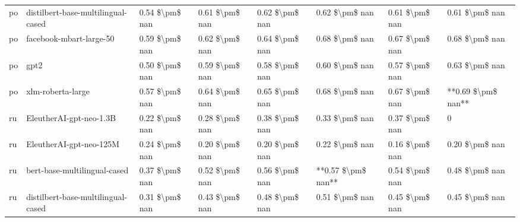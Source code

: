 \begin{tabular}{llllllll}
      po & distilbert-base-multilingual-cased & 0.54 \$\textbackslash pm\$ nan &            0.61 \$\textbackslash pm\$ nan &        0.62 \$\textbackslash pm\$ nan &         0.62 \$\textbackslash pm\$ nan &                          0.61 \$\textbackslash pm\$ nan &     0.61 \$\textbackslash pm\$ nan \\
      po &            facebook-mbart-large-50 & 0.59 \$\textbackslash pm\$ nan &            0.62 \$\textbackslash pm\$ nan &        0.64 \$\textbackslash pm\$ nan &         0.68 \$\textbackslash pm\$ nan &                          0.67 \$\textbackslash pm\$ nan &     0.68 \$\textbackslash pm\$ nan \\
      po &                               gpt2 & 0.50 \$\textbackslash pm\$ nan &            0.59 \$\textbackslash pm\$ nan &        0.58 \$\textbackslash pm\$ nan &         0.60 \$\textbackslash pm\$ nan &                          0.57 \$\textbackslash pm\$ nan &     0.63 \$\textbackslash pm\$ nan \\
      po &                  xlm-roberta-large & 0.57 \$\textbackslash pm\$ nan &            0.64 \$\textbackslash pm\$ nan &        0.65 \$\textbackslash pm\$ nan &         0.68 \$\textbackslash pm\$ nan &                          0.67 \$\textbackslash pm\$ nan & **0.69 \$\textbackslash pm\$ nan** \\
      ru &            EleutherAI-gpt-neo-1.3B & 0.22 \$\textbackslash pm\$ nan &            0.28 \$\textbackslash pm\$ nan &        0.38 \$\textbackslash pm\$ nan &         0.33 \$\textbackslash pm\$ nan &                          0.37 \$\textbackslash pm\$ nan &                  0 \\
      ru &            EleutherAI-gpt-neo-125M & 0.24 \$\textbackslash pm\$ nan &            0.20 \$\textbackslash pm\$ nan &        0.20 \$\textbackslash pm\$ nan &         0.22 \$\textbackslash pm\$ nan &                          0.16 \$\textbackslash pm\$ nan &     0.20 \$\textbackslash pm\$ nan \\
      ru &       bert-base-multilingual-cased & 0.37 \$\textbackslash pm\$ nan &            0.52 \$\textbackslash pm\$ nan &        0.56 \$\textbackslash pm\$ nan &     **0.57 \$\textbackslash pm\$ nan** &                          0.54 \$\textbackslash pm\$ nan &     0.48 \$\textbackslash pm\$ nan \\
      ru & distilbert-base-multilingual-cased & 0.31 \$\textbackslash pm\$ nan &            0.43 \$\textbackslash pm\$ nan &        0.48 \$\textbackslash pm\$ nan &         0.51 \$\textbackslash pm\$ nan &                          0.45 \$\textbackslash pm\$ nan &     0.45 \$\textbackslash pm\$ nan \\

\end{tabular}
